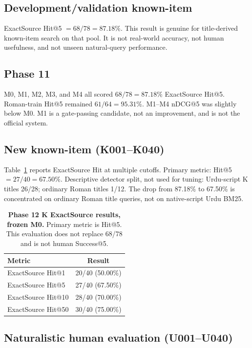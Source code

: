 \documentclass[10pt,letterpaper]{article}
\begin{document}
\subsection*{Development/validation known-item}

ExactSource Hit@5 \(=68/78=87.18\%\). This result is genuine for title-derived known-item search on that pool. It is not real-world accuracy, not human usefulness, and not unseen natural-query performance.

\subsection*{Phase 11}

M0, M1, M2, M3, and M4 all scored \(68/78=87.18\%\) ExactSource Hit@5. Roman-train Hit@5 remained \(61/64=95.31\%\). M1--M4 nDCG@5 was slightly below M0. M1 is a gate-passing candidate, not an improvement, and is not the official system.

\subsection*{New known-item (K001--K040)}

Table~\ref{tab:k} reports ExactSource Hit at multiple cutoffs. Primary metric: Hit@5 \(=27/40=67.50\%\). Descriptive detector split, not used for tuning: Urdu-script K titles 26/28; ordinary Roman titles 1/12. The drop from 87.18\% to 67.50\% is concentrated on ordinary Roman title queries, not on native-script Urdu BM25.

\begin{table}[H]
\centering
\caption{\textbf{Phase 12 K ExactSource results, frozen M0.} Primary metric is Hit@5. This evaluation does not replace 68/78 and is not human Success@5.}
\label{tab:k}
\begin{tabular}{lc}
\toprule
\textbf{Metric} & \textbf{Result} \\
\midrule
ExactSource Hit@1 & 20/40 (50.00\%) \\
ExactSource Hit@5 & 27/40 (67.50\%) \\
ExactSource Hit@10 & 28/40 (70.00\%) \\
ExactSource Hit@50 & 30/40 (75.00\%) \\
\bottomrule
\end{tabular}
\end{table}

\subsection*{Naturalistic human evaluation (U001--U040)}
\end{document}
